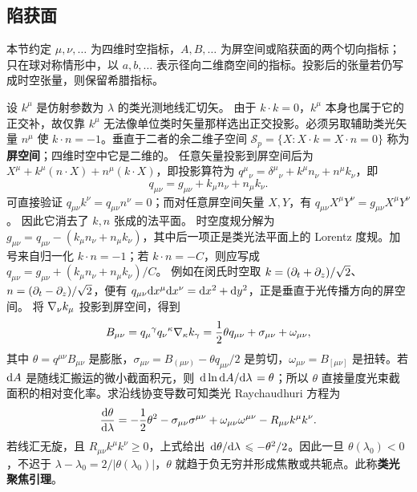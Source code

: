\subsection{陷获面}

本节约定 $\mu,\nu,\ldots$ 为四维时空指标，$A,B,\ldots$ 为屏空间或陷获面的两个切向指标；只在球对称情形中，以 $a,b,\ldots$ 表示径向二维商空间的指标。投影后的张量若仍写成时空张量，则保留希腊指标。

设 $k^\mu$ 是仿射参数为 $\lambda$ 的类光测地线汇切矢。
由于 $k\cdot k=0$，$k^\mu$ 本身也属于它的正交补，故仅靠 $k^\mu$ 无法像单位类时矢量那样选出正交投影。必须另取辅助类光矢量 $n^\mu$ 使 $k\cdot n=-1$。垂直于二者的余二维子空间 $\mathcal S_p=\{X:X\cdot k=X\cdot n=0\}$ 称为\textbf{屏空间}；四维时空中它是二维的。
任意矢量投影到屏空间后为 $X^\mu+k^\mu(n\cdot X)+n^\mu(k\cdot X)$，即投影算符为 $q^\mu{}_\nu=\delta^\mu{}_\nu+k^\mu n_\nu+n^\mu k_\nu$，即
\[q_{\mu\nu}=g_{\mu\nu}+k_\mu n_\nu+n_\mu k_\nu.\]
可直接验证 $q_{\mu\nu}k^\nu=q_{\mu\nu}n^\nu=0$；而对任意屏空间矢量 $X,Y$，有 $q_{\mu\nu}X^\mu Y^\nu=g_{\mu\nu}X^\mu Y^\nu$。
因此它消去了 $k,n$ 张成的法平面。
时空度规分解为 $g_{\mu\nu}=q_{\mu\nu}-(k_\mu n_\nu+n_\mu k_\nu)$，其中后一项正是类光法平面上的 Lorentz 度规。加号来自归一化 $k\cdot n=-1$；若 $k\cdot n=-C$，则应写成 $q_{\mu\nu}=g_{\mu\nu}+(k_\mu n_\nu+n_\mu k_\nu)/C$。
例如在闵氏时空取 $k=(\partial_t+\partial_z)/\sqrt2$、$n=(\partial_t-\partial_z)/\sqrt2$，便有 $q_{\mu\nu}\dd x^\mu\dd x^\nu=\dd x^2+\dd y^2$，正是垂直于光传播方向的屏空间。
将 $\nabla_\nu k_\mu $ 投影到屏空间，得到
\begin{equation}\label{eq:null-congruence-decomposition}
    B_{\mu\nu}=q_\mu{}^\gamma q_\nu{}^\kappa\nabla_\kappa k_\gamma
      =\frac12\theta q_{\mu\nu}+\sigma_{\mu\nu}+\omega_{\mu\nu},
\end{equation}
其中 $\theta=q^{\mu\nu}B_{\mu\nu}$ 是膨胀，$\sigma_{\mu\nu}=B_{(\mu\nu)}-\theta q_{\mu\nu}/2$ 是剪切，$\omega_{\mu\nu}=B_{[\mu\nu]}$ 是扭转。若 $\dd A$ 是随线汇搬运的微小截面积元，则 $\dv*{\ln\dd A}{\lambda}=\theta$；所以 $\theta$ 直接量度光束截面积的相对变化率。求沿线协变导数可知类光 Raychaudhuri 方程为
\begin{equation}\label{eq:null-raychaudhuri}
    \dv{\theta}{\lambda}
    =-\frac12\theta^2-\sigma_{\mu\nu}\sigma^{\mu\nu}
      +\omega_{\mu\nu}\omega^{\mu\nu}-R_{\mu\nu}k^\mu k^\nu .
\end{equation}
若线汇无旋，且 $R_{\mu\nu}k^\mu k^\nu\geqslant 0$，上式给出 $\dv*{\theta}{\lambda}\leqslant-\theta^2/2$。因此一旦 $\theta(\lambda_0)<0$，不迟于 $\lambda-\lambda_0=2/|\theta(\lambda_0)|$，$\theta$ 就趋于负无穷并形成焦散或共轭点。此称\textbf{类光聚焦引理}。

